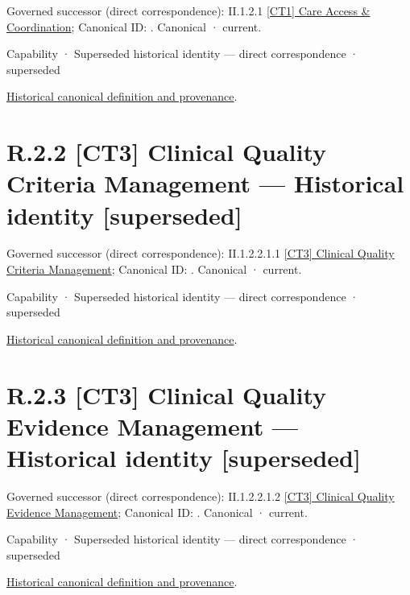 {\small Governed successor (direct correspondence): II.1.2.1 \hyperref[element:ed342cb8656b4f80b55ad519ecbd2d3a]{[CT1] Care Access \& Coordination}; Canonical ID: \texttt{}. Canonical · current.}\par
\label{element:0dec07b6ddbe48bda93a2295dd3e2d7d}
{\small Capability · Superseded historical identity — direct correspondence · superseded}\par
\href{../../../../../../../continuum/strategy/capability/0dec07b6ddbe48bda93a2295dd3e2d7d.md}{Historical canonical definition and provenance}.\par
\section*{R.2.2 [CT3] Clinical Quality Criteria Management — Historical identity [superseded]}
\label{navigation:R.2.2}

{\small Governed successor (direct correspondence): II.1.2.2.1.1 \hyperref[element:1f48527a9a7c4382a7f8a660ccb9f29f]{[CT3] Clinical Quality Criteria Management}; Canonical ID: \texttt{}. Canonical · current.}\par
\label{element:7a51321b00464016920976b269981edd}
{\small Capability · Superseded historical identity — direct correspondence · superseded}\par
\href{../../../../../../../continuum/strategy/capability/7a51321b00464016920976b269981edd.md}{Historical canonical definition and provenance}.\par
\section*{R.2.3 [CT3] Clinical Quality Evidence Management — Historical identity [superseded]}
\label{navigation:R.2.3}

{\small Governed successor (direct correspondence): II.1.2.2.1.2 \hyperref[element:1b0a1c6945ed4fadba045ff4753c104c]{[CT3] Clinical Quality Evidence Management}; Canonical ID: \texttt{}. Canonical · current.}\par
\label{element:f31902d474894670aeef3e0abbedccf0}
{\small Capability · Superseded historical identity — direct correspondence · superseded}\par
\href{../../../../../../../continuum/strategy/capability/f31902d474894670aeef3e0abbedccf0.md}{Historical canonical definition and provenance}.\par
